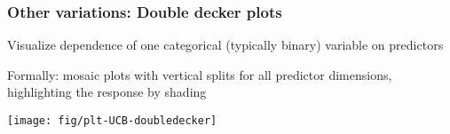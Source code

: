 \begin{frame}
  \frametitle{Other variations: Double decker plots}
	 \begin{itemize*}
		 \item Visualize dependence of one categorical (typically binary) variable on predictors
		 \item Formally: mosaic plots with vertical splits for all \alert{predictor dimensions}, highlighting the
		 response by shading
	 \end{itemize*}
 \begin{center}
\texttt{[image: fig/plt-UCB-doubledecker]}
 \end{center}
\end{frame}
